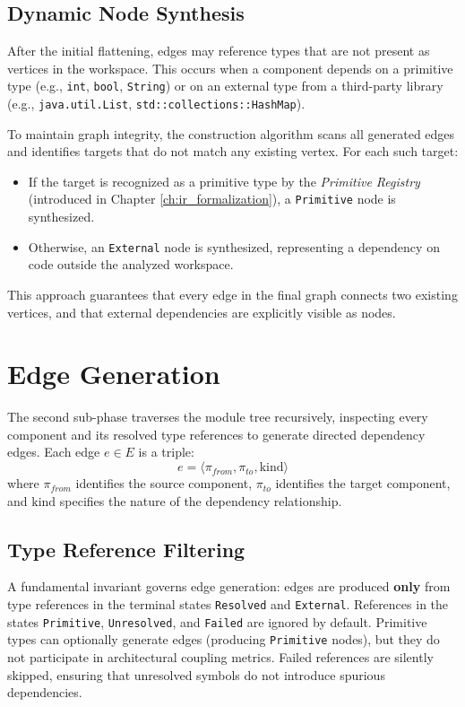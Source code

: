 \subsection{Dynamic Node Synthesis}

After the initial flattening, edges may reference types that are not present as vertices in the workspace. This occurs when a component depends on a primitive type (e.g., \texttt{int}, \texttt{bool}, \texttt{String}) or on an external type from a third-party library (e.g., \texttt{java.util.List}, \texttt{std::collections::HashMap}).

To maintain graph integrity, the construction algorithm scans all generated edges and identifies targets that do not match any existing vertex. For each such target:
\begin{itemize}
  \item If the target is recognized as a primitive type by the \textit{Primitive Registry} (introduced in Chapter \ref{ch:ir_formalization}), a \texttt{Primitive} node is synthesized.
  \item Otherwise, an \texttt{External} node is synthesized, representing a dependency on code outside the analyzed workspace.
\end{itemize}

This approach guarantees that every edge in the final graph connects two existing vertices, and that external dependencies are explicitly visible as nodes.

\section{Edge Generation}
\label{sec:edge_generation}

The second sub-phase traverses the module tree recursively, inspecting every component and its resolved type references to generate directed dependency edges. Each edge $e \in E$ is a triple:
$$e = \langle \pi_{from}, \pi_{to}, \text{kind} \rangle$$
where $\pi_{from}$ identifies the source component, $\pi_{to}$ identifies the target component, and $\text{kind}$ specifies the nature of the dependency relationship.

\subsection{Type Reference Filtering}

A fundamental invariant governs edge generation: edges are produced \textbf{only} from type references in the terminal states \texttt{Resolved} and \texttt{External}. References in the states \texttt{Primitive}, \texttt{Unresolved}, and \texttt{Failed} are ignored by default. Primitive types can optionally generate edges (producing \texttt{Primitive} nodes), but they do not participate in architectural coupling metrics. Failed references are silently skipped, ensuring that unresolved symbols do not introduce spurious dependencies.

